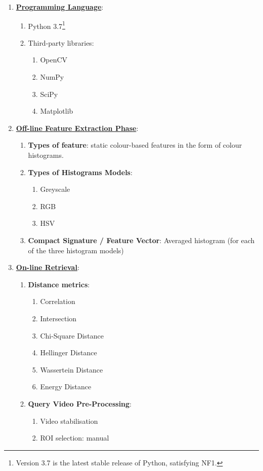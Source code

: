 \begin{enumerate}
    \item \underline{\textbf{Programming Language}}: 
    \begin{enumerate}
        \item Python 3.7\footnote{Version 3.7 is the latest stable release of Python, satisfying NF1.}
        \item Third-party libraries:
        \begin{enumerate}
            \item OpenCV
            \item NumPy
            \item SciPy
            \item Matplotlib
        \end{enumerate}
    \end{enumerate}
    
    \item \underline{\textbf{Off-line Feature Extraction Phase}}:
    \begin{enumerate}
        \item \textbf{Types of feature}: static colour-based features in the form of colour histograms.
        \item \textbf{Types of Histograms Models}:
        \begin{enumerate}
            \item Greyscale
            \item RGB
            \item HSV
        \end{enumerate}
        \item \textbf{Compact Signature / Feature Vector}: Averaged histogram (for each of the three histogram models)
    \end{enumerate}
    
    \item \underline{\textbf{On-line Retrieval}}: 
    \begin{enumerate}
        \item \textbf{Distance metrics}:
            \begin{enumerate}
                \item Correlation
                \item Intersection
                \item Chi-Square Distance
                \item Hellinger Distance
                \item Wassertein Distance
                \item Energy Distance
            \end{enumerate}
        \item \textbf{Query Video Pre-Processing}:
        \begin{enumerate}
            \item Video stabilisation
            \item ROI selection: manual
        \end{enumerate}
    \end{enumerate}
    

\end{enumerate}
